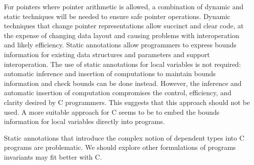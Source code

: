 For pointers where pointer arithmetic is allowed, a combination of
dynamic and static techniques will be needed to ensure safe pointer
operations. Dynamic techniques that change pointer representations allow
succinct and clear code, at the expense of changing data layout and
causing problems with interoperation and likely efficiency. Static
annotations allow programmers to express bounds information for existing
data structures and parameters and support interoperation. The use of
static annotations for local variables is not required: automatic
inference and insertion of computations to maintain bounds information
and check bounds can be done instead. However, the inference and
automatic insertion of computation compromises the control, efficiency,
and clarity desired by C programmers. This suggests that this approach
should not be used. A more suitable approach for C seems to be to embed
the bounds information for local variables directly into programs.

Static annotations that introduce the complex notion of dependent types
into C programs are problematic. We should explore other formulations of
programs invariants may fit better with C.